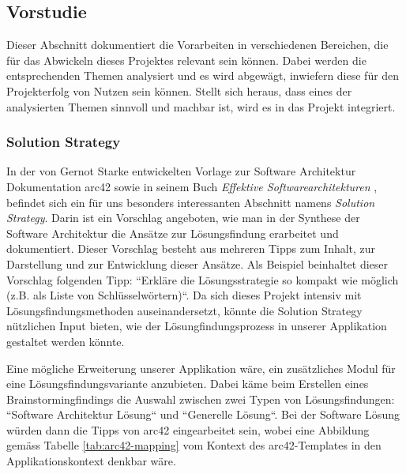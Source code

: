 \subsection{Vorstudie}
Dieser Abschnitt dokumentiert die Vorarbeiten in verschiedenen Bereichen, die für das Abwickeln dieses Projektes relevant sein können. Dabei werden die entsprechenden Themen analysiert und es wird abgewägt, inwiefern diese für den Projekterfolg von Nutzen sein können. Stellt sich heraus, dass eines der analysierten Themen sinnvoll und machbar ist, wird es in das Projekt integriert.

\subsubsection{Solution Strategy}

In der von Gernot Starke entwickelten Vorlage zur Software Architektur Dokumentation arc42 \cite{arc-42} sowie in seinem Buch \textit{Effektive Softwarearchitekturen} \cite{eswa}, befindet sich ein für uns besonders interessanten Abschnitt namens \textit{Solution Strategy}. Darin ist ein Vorschlag angeboten, wie man in der Synthese der Software Architektur die Ansätze zur Lösungsfindung erarbeitet und dokumentiert. Dieser Vorschlag besteht aus mehreren Tipps zum Inhalt, zur Darstellung und zur Entwicklung dieser Ansätze. Als Beispiel beinhaltet dieser Vorschlag folgenden Tipp: ``Erkläre die Lösungsstrategie so kompakt wie möglich (z.B. als Liste von Schlüsselwörtern)``. Da sich dieses Projekt intensiv mit Lösungsfindungsmethoden auseinandersetzt, könnte die Solution Strategy nützlichen Input bieten, wie der Lösungfindungsprozess in unserer Applikation gestaltet werden könnte. 

Eine mögliche Erweiterung unserer Applikation wäre, ein zusätzliches Modul für eine Lösungsfindungsvariante anzubieten. Dabei käme beim Erstellen eines Brainstormingfindings die Auswahl zwischen zwei Typen von Lösungsfindungen: ``Software Architektur Lösung`` und ``Generelle Lösung``. Bei der Software Lösung würden dann die Tipps von arc42 eingearbeitet sein, wobei eine Abbildung gemäss Tabelle \ref{tab:arc42-mapping} vom Kontext des arc42-Templates in den Applikationskontext denkbar wäre.

